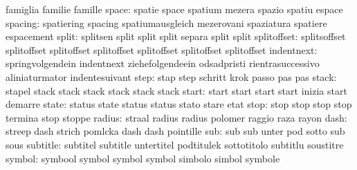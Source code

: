                            famiglia                  familie
                           famille
                    space: spatie                    space
                           spatium                   mezera
                           spazio                    spatiu
                           espace
                  spacing: spatiering                spacing
                           spatiumausgleich          mezerovani
                           spaziatura                spatiere
                           espacement
                    split: splitsen                  split
                           split                     split
                           separa                    split
                           split
              splitoffset: splitsoffset              splitoffset
                           splitoffset               splitoffset
                           splitoffset               splitoffset
                           splitoffset
               indentnext: springvolgendein          indentnext
                           ziehefolgendeein          odsadpristi
                           rientrasuccessivo         aliniaturmator
                           indentesuivant
                     step: stap                      step
                           schritt                   krok
                           passo                     pas
                           pas
                    stack: stapel                    stack
                           stack                     stack
                           stack                     stack
                           stack
                    start: start                     start
                           start                     start
                           inizia                    start
                           demarre
                    state: status                    state
                           status                    status
                           stato                     stare
                           etat
                     stop: stop                      stop
                           stop                      stop
                           termina                   stop
                           stoppe
                   radius: straal                    radius
                           radius                    polomer
                           raggio                    raza
                           rayon
                     dash: streep                    dash
                           strich                    pomlcka
                           dash                      dash
                           pointille
                      sub: sub                       sub
                           unter                     pod
                           sotto                     sub
                           sous
                 subtitle: subtitel                  subtitle
                           untertitel                podtitulek
                           sottotitolo               subtitlu
                           soustitre
                   symbol: symbool                   symbol
                           symbol                    symbol
                           simbolo                   simbol
                           symbole

